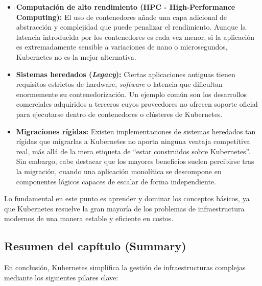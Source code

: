 \begin{itemize}
    \item \textbf{Computación de alto rendimiento (HPC - High-Performance Computing):} El uso de contenedores añade una capa adicional de abstracción y complejidad que puede penalizar el rendimiento. Aunque la latencia introducida por los contenedores es cada vez menor, si la aplicación es extremadamente sensible a variaciones de nano o microsegundos, Kubernetes no es la mejor alternativa.
    \item \textbf{Sistemas heredados (\textit{Legacy}):} Ciertas aplicaciones antiguas tienen requisitos estrictos de hardware, \textit{software} o latencia que dificultan enormemente su contenedorización. Un ejemplo común son los desarrollos comerciales adquiridos a terceros cuyos proveedores no ofrecen soporte oficial para ejecutarse dentro de contenedores o clústeres de Kubernetes.
    \item \textbf{Migraciones rígidas:} Existen implementaciones de sistemas heredados tan rígidas que migrarlas a Kubernetes no aporta ninguna ventaja competitiva real, más allá de la mera etiqueta de ``estar construidos sobre Kubernetes''. Sin embargo, cabe destacar que los mayores beneficios suelen percibirse tras la migración, cuando una aplicación monolítica se descompone en componentes lógicos capaces de escalar de forma independiente.
\end{itemize}

Lo fundamental en este punto es aprender y dominar los conceptos básicos, ya que Kubernetes resuelve la gran mayoría de los problemas de infraestructura modernos de una manera estable y eficiente en costos.

\subsection{Resumen del capítulo (Summary)}

En conclusión, Kubernetes simplifica la gestión de infraestructuras complejas mediante los siguientes pilares clave:

